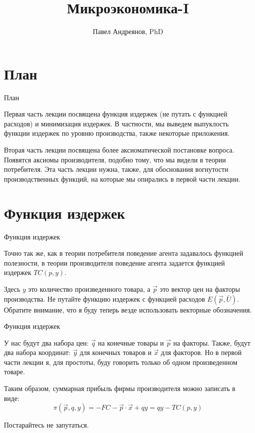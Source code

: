 \documentclass{beamer}
\title{
Микроэкономика-I
}
\author{
Павел Андреянов, PhD
}
\begin{document}
\maketitle

\section{План}

\begin{frame}{План}

Первая часть лекции посвящена функция издержек (не путать с функцией расходов) и минимизация издержек. В частности, мы выведем выпуклость функции издержек по уровню производства, также некоторые приложения.

Вторая часть лекции посвящена более аксиоматической постановке вопроса. Появятся аксиомы производителя, подобно тому, что мы видели в теории потребителя. Эта часть лекции нужна, также, для обоснования вогнутости производственных функций, на которые мы опирались в первой части лекции.

\end{frame}


\section{Функция издержек}

\begin{frame}{Функция издержек}

Точно так же, как в теории потребителя поведение агента задавалось функцией полезности, в теории производителя поведение агента задается функцией издержек $TC(p, y)$.

Здесь $y$ это количество произведенного товара, а $\vec p$ это вектор цен на факторы производства. Не путайте функцию издержек с функцией расходов $E(\vec p, \bar U)$. Обратите внимание, что я буду теперь везде использовать векторные обозначения.

\end{frame}

\begin{frame}{Функция издержек}

У нас будут два набора цен: $\vec q$ на конечные товары и $\vec p$ на факторы. Также, будут два набора координат: $\vec y$ для конечных товаров и $\vec x$ для факторов. Но в первой части лекции я, для простоты, буду говорить только об одном произведенном товаре.

Таким образом, суммарная прибыль фирмы производителя можно записать в виде:
$$ \pi(\vec p, q, y) = - FC - \vec p \cdot \vec x + q y = q y - TC(p, y)$$

Постарайтесь не запутаться.

\end{frame}
\end{document}
